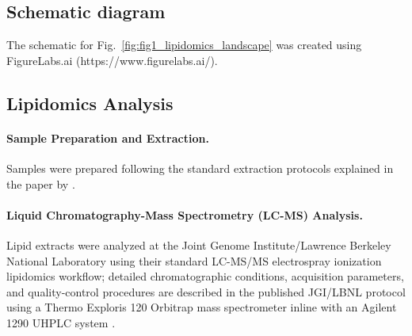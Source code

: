 \documentclass[9pt,twocolumn,twoside]{rilabRxiv}
\begin{document}
\subsection*{Schematic diagram}
The schematic for Fig.~\ref{fig:fig1_lipidomics_landscape} was created using FigureLabs.ai (https://www.figurelabs.ai/).

\subsection*{Lipidomics Analysis}

\paragraph{Sample Preparation and Extraction.} 
Samples were prepared following the standard extraction protocols explained in the paper by \cite{Barnes2022}.

\paragraph{Liquid Chromatography-Mass Spectrometry (LC-MS) Analysis.}  Lipid extracts were analyzed at the Joint Genome Institute/Lawrence Berkeley National Laboratory using their standard LC-MS/MS electrospray ionization lipidomics workflow; detailed chromatographic conditions, acquisition parameters, and quality-control procedures are described in the published JGI/LBNL protocol using a Thermo Exploris 120 Orbitrap mass spectrometer inline with an Agilent 1290 UHPLC system \citep{Louie2025JGI_Lipids}.

\end{document}
